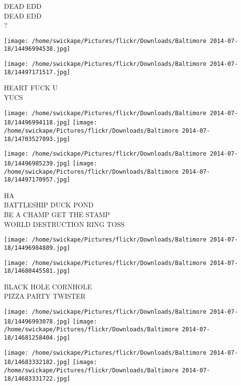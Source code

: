 \documentclass[10pt,letterpaper]{article}
\begin{document}
DEAD EDD\\
DEAD EDD\\
?\\
\pagebreak

\texttt{[image: /home/swickape/Pictures/flickr/Downloads/Baltimore 2014-07-18/14496994538.jpg]}

\vspace{0.25in}
\texttt{[image: /home/swickape/Pictures/flickr/Downloads/Baltimore 2014-07-18/14497171517.jpg]}

HEART FUCK U\\
YUCS\\
\pagebreak

\texttt{[image: /home/swickape/Pictures/flickr/Downloads/Baltimore 2014-07-18/14496994118.jpg]}
\texttt{[image: /home/swickape/Pictures/flickr/Downloads/Baltimore 2014-07-18/14703527093.jpg]}

\texttt{[image: /home/swickape/Pictures/flickr/Downloads/Baltimore 2014-07-18/14496985239.jpg]}
\texttt{[image: /home/swickape/Pictures/flickr/Downloads/Baltimore 2014-07-18/14497170957.jpg]}

HA\\
BATTLESHIP DUCK POND\\
BE A CHAMP GET THE STAMP\\
WORLD DESTRUCTION RING TOSS\\
\pagebreak

\texttt{[image: /home/swickape/Pictures/flickr/Downloads/Baltimore 2014-07-18/14496984889.jpg]}

\vspace{0.25in}
\texttt{[image: /home/swickape/Pictures/flickr/Downloads/Baltimore 2014-07-18/14680445581.jpg]}

BLACK HOLE CORNHOLE\\
PIZZA PARTY TWISTER\\
\pagebreak

\texttt{[image: /home/swickape/Pictures/flickr/Downloads/Baltimore 2014-07-18/14496993078.jpg]}
\texttt{[image: /home/swickape/Pictures/flickr/Downloads/Baltimore 2014-07-18/14681258404.jpg]}

\texttt{[image: /home/swickape/Pictures/flickr/Downloads/Baltimore 2014-07-18/14683332182.jpg]}
\texttt{[image: /home/swickape/Pictures/flickr/Downloads/Baltimore 2014-07-18/14683331722.jpg]}
\end{document}
